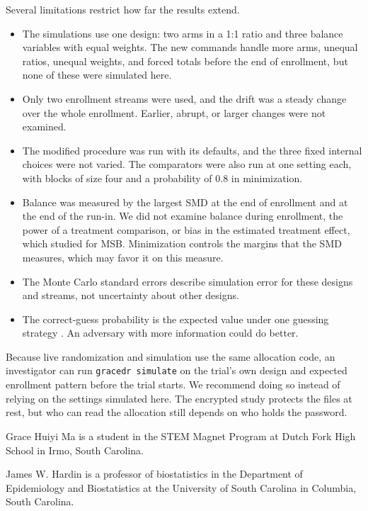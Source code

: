 \documentclass[bib]{statapress}
\begin{document}
Several limitations restrict how far the results extend.
\begin{itemize}
\item The simulations use one design: two arms in a 1:1 ratio and three balance
variables with equal weights. The new commands handle more arms, unequal ratios,
unequal weights, and forced totals before the end of enrollment, but none of
these were simulated here.
\item Only two enrollment streams were used, and the drift was a steady change
over the whole enrollment. Earlier, abrupt, or larger changes were not examined.
\item The modified procedure was run with its defaults, and the three fixed
internal choices were not varied. The comparators were also run at one setting
each, with blocks of size four and a probability of 0.8 in minimization.
\item Balance was measured by the largest SMD at the end of enrollment and at
the end of the run-in. We did not examine balance during enrollment, the power
of a treatment comparison, or bias in the estimated treatment effect, which
\citet{lauzon2022msb} studied for MSB. Minimization controls the margins that
the SMD measures, which may favor it on this measure.
\item The Monte Carlo standard errors describe simulation error for these
designs and streams, not uncertainty about other designs.
\item The correct-guess probability is the expected value under one guessing
strategy \citep{blackwell1957}. An adversary with more information could do
better.
\end{itemize}

Because live randomization and simulation use the same allocation code, an
investigator can run \texttt{gracedr simulate} on the trial's own design and
expected enrollment pattern before the trial starts. We recommend doing so
instead of relying on the settings simulated here. The encrypted study protects
the files at rest, but who can read the allocation still depends on who holds
the password.




\begin{aboutauthors}
Grace Huiyi Ma is a student in the STEM Magnet Program at Dutch Fork High
School in Irmo, South Carolina.

James W. Hardin is a professor of biostatistics in the Department of
Epidemiology and Biostatistics at the University of South Carolina in Columbia,
South Carolina.
\end{aboutauthors}
\end{document}
